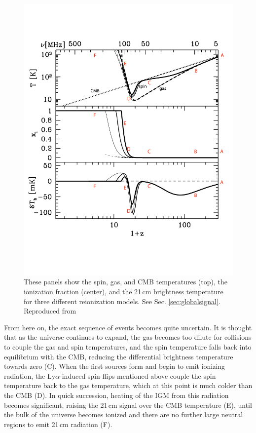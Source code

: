 {\begin{figure}
	\centering
	\includegraphics[width=6in]{chap0_intro/pritchard_and_loeb_temperatures_annotated.pdf}
	\caption[The spin, gas, and CMB temperatures, the ionization fraction, and the 21\,cm brightness temperature for three different reionization models.]{These panels show the spin, gas, and CMB temperatures (top), the ionization fraction (center), and the 21\,cm brightness temperature for three different reionization models. See Sec. \ref{sec:globalsignal}. Reproduced from \citet{PritchardLoebReview}}
	\label{fig:pritchardloebtemperatures}
\end{figure}

From here on, the exact sequence of events becomes quite uncertain. It is thought that as the universe continues to expand, the gas becomes too dilute for collisions to couple the gas and spin temperatures, and the spin temperature falls back into equilibrium with the CMB, reducing the differential brightness temperature towards zero (C). When the first sources form and begin to emit ionizing radiation, the Ly$\alpha$-induced spin flips mentioned above couple the spin temperature back to the gas temperature, which at this point is much colder than the CMB (D). In quick succession, heating of the IGM from this radiation becomes significant, raising the 21\,cm signal over the CMB temperature (E), until the bulk of the universe becomes ionized and there are no further large neutral regions to emit 21\,cm radiation (F).

}
